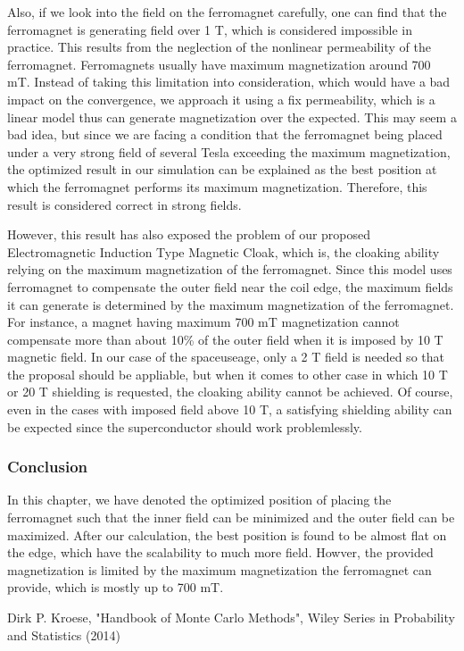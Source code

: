 Also, if we look into the field on the ferromagnet carefully,
one can find that the ferromagnet is generating field over 1 T,
which is considered impossible in practice.
This results from the neglection of the nonlinear permeability of the ferromagnet.
Ferromagnets usually have maximum magnetization around 700 mT.
Instead of taking this limitation into consideration, which would have a bad impact on the convergence,
we approach it using a fix permeability,
which is a linear model thus can generate magnetization over the expected.
This may seem a bad idea, but since we are facing a condition that
the ferromagnet being placed under a very strong field of several Tesla exceeding the maximum magnetization,
the optimized result in our simulation can be explained as the best position at which the ferromagnet performs its maximum magnetization.
Therefore, this result is considered correct in strong fields.

However, this result has also exposed the problem of our proposed Electromagnetic Induction Type Magnetic Cloak,
which is,
the cloaking ability relying on the maximum magnetization of the ferromagnet.
Since this model uses ferromagnet to compensate the outer field near the coil edge,
the maximum fields it can generate is determined by the maximum magnetization of the ferromagnet.
For instance, a magnet having maximum 700 mT magnetization cannot compensate more than about 10\% of the outer field when it is imposed by 10 T magnetic field.
In our case of the spaceuseage, only a 2 T field is needed so that the proposal should be appliable,
but when it comes to other case in which 10 T or 20 T shielding is requested,
the cloaking ability cannot be achieved.
Of course, even in the cases with imposed field above 10 T, a satisfying shielding ability can be expected since the superconductor should work problemlessly.


\subsubsection{Conclusion}
In this chapter,
we have denoted the optimized position of placing the ferromagnet such that the inner field can be minimized and the outer field can be maximized.
After our calculation, the best position is found to be almost flat on the edge,
which have the scalability to much more field.
Howver, the provided magnetization is limited by the maximum magnetization the ferromagnet can provide,
which is mostly up to 700 mT.


\newpage
\begin{thebibliography}{20}
   Dirk P. Kroese, "Handbook of Monte Carlo Methods", Wiley Series in Probability and Statistics (2014)
\end{thebibliography}
